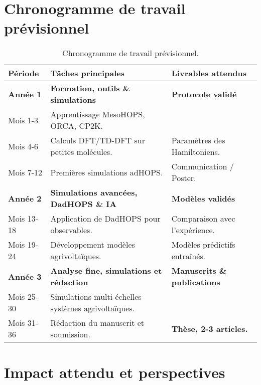 \documentclass[12pt, a4paper]{article}
\begin{document}
\newpage

\section{Chronogramme de travail prévisionnel}
\begin{table}[ht]
    \centering
    \caption{Chronogramme de travail prévisionnel.}
    \label{tab:timeline}
    \begin{tabular}{@{}lll@{}}
        \toprule
        \textbf{Période} & \textbf{Tâches principales} & \textbf{Livrables attendus} \\ \midrule
        \textbf{Année 1} & \textbf{Formation, outils \& simulations} & \textbf{Protocole validé} \\
        Mois 1-3 & Apprentissage MesoHOPS, ORCA, CP2K. & \\
        Mois 4-6 & Calculs DFT/TD-DFT sur petites molécules. & Paramètres des Hamiltoniens. \\
        Mois 7-12 & Premières simulations adHOPS. & Communication / Poster. \\ \midrule
        \textbf{Année 2} & \textbf{Simulations avancées, DadHOPS \& IA} & \textbf{Modèles validés} \\
        Mois 13-18 & Application de DadHOPS pour observables. & Comparaison avec l'expérience. \\
        Mois 19-24 & Développement modèles agrivoltaïques. & Modèles prédictifs entraînés. \\ \midrule
        \textbf{Année 3} & \textbf{Analyse fine, simulations et rédaction} & \textbf{Manuscrits \& publications} \\
        Mois 25-30 & Simulations multi-échelles systèmes agrivoltaïques. & \\
        Mois 31-36 & Rédaction du manuscrit et soumission. & \textbf{Thèse, 2-3 articles.} \\ \bottomrule
    \end{tabular}
\end{table}

\section{Impact attendu et perspectives}
\end{document}

